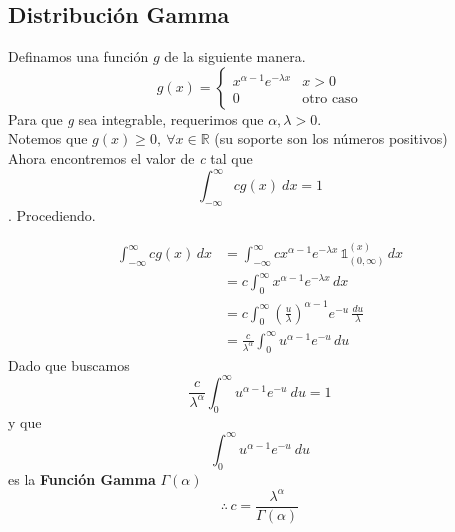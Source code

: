 \subsection{Distribución Gamma}

Definamos una función $g$ de la siguiente manera.
\[g(x) = 
  \begin{cases}
    x^{\alpha - 1}e^{-\lambda x} & x > 0\\
    0 & \text{otro caso}
  \end{cases}
\]
Para que \textit{g} sea integrable, requerimos que $\alpha, \lambda > 0$.\\
Notemos que $g(x) \ge 0,~ \forall x \in \mathbb R$ (su soporte son los números positivos)\\
Ahora encontremos el valor de \textit{c} tal que
\[\int_{-\infty}^{\infty}cg(x)~dx = 1\]. Procediendo.

\begin{align*}
  \int_{-\infty}^{\infty}cg(x)\,dx &= \int_{-\infty}^{\infty}c x^{\alpha -1}e^{-\lambda x} \, \mathbb 1_{(0, \infty)}^{(x)} \,dx\\
                                  &= c\int_0^{\infty} x^{\alpha -1}e^{-\lambda x} \,dx\\
                                  &= c\int_0^{\infty}(\frac  u\lambda)^{\alpha-1}e^{-u}\, \frac{du}\lambda \\
                                  &= \frac c{\lambda^\alpha} \int_0^{\infty} u^{\alpha - 1}e^{-u}\,du
\end{align*}
Dado que buscamos 
\[\frac c{\lambda^\alpha} \int_0^{\infty} u^{\alpha - 1}e^{-u}~du = 1\] y que 
\[\int_0^{\infty} u^{\alpha - 1}e^{-u}~du\] es la \textbf{Función Gamma} $\Gamma(\alpha)$
\[\boxed{\therefore \,c = \frac{\lambda^\alpha}{\Gamma(\alpha)}}\]



